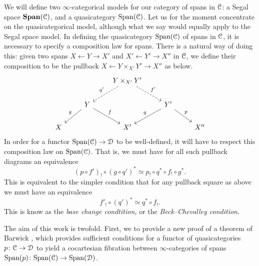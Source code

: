 \documentclass[main.tex]{subfiles}
\begin{document}
We will define two $\infty$-categorical models for our category of spans in $\mathcal{C}$: a Segal space $\mathbf{Span}(\mathcal{C})$, and a quasicategory $\mathrm{Span}(\mathcal{C})$. Let us for the moment concentrate on the quasicategorical model, although what we say would equally apply to the Segal space model. In defining the quasicategory $\mathrm{Span}(\mathcal{C})$ of spans in $\mathcal{C}$, it is necessary to specify a composition law for spans. There is a natural way of doing this: given two spans $X \leftarrow Y \rightarrow X'$ and $X' \leftarrow Y' \rightarrow X''$ in $\mathcal{C}$, we define their composition to be the pullback $X \leftarrow Y \times_{X'} Y' \rightarrow X''$ as below.
\begin{equation*}
  \begin{tikzcd}
    && Y \times_{X'} Y'
    \arrow[dl, dashed, swap, "q'"]
    \arrow[dr, dashed, "f'"]
    \\
    & Y
    \arrow[dl, swap, "g"]
    \arrow[dr, "f"]
    && Y'
    \arrow[dl, swap, "q"]
    \arrow[dr, "p"]
    \\
    X
    && X'
    && X''
  \end{tikzcd}
\end{equation*}
In order for a functor $\mathrm{Span}(\mathcal{C}) \to \mathcal{D}$ to be well-defined, it will have to respect this composition law on $\mathrm{Span}(\mathcal{C})$. That is, we must have for all such pullback diagrams an equivalence
\begin{equation*}
  (p \circ f')_{!} \circ (g \circ q')^{*} \simeq p_{!} \circ q^{*} \circ f_{!} \circ g^{*}.
\end{equation*}
This is equivalent to the simpler condition that for any pullback square as above we must have an equivalence
\begin{equation*}
  f'_{!} \circ (q')^{*} \simeq q^{*} \circ f_{!}.
\end{equation*}
This is know as the \emph{base change condtition,} or the \emph{Beck--Chevalley condition.}

The aim of this work is twofold. First, we to provide a new proof of a theorem of Barwick \cite[Thm.~12.2]{spectralmackeyfunctors1}, which provides sufficient conditions for a functor of quasicategories $p\colon \mathcal{C} \to \mathcal{D}$ to yield a cocartesian fibration between $\infty$-categories of spans $\mathrm{Span}(p)\colon \mathrm{Span}(\mathcal{C}) \to \mathrm{Span}(\mathcal{D})$. %
\end{document}
